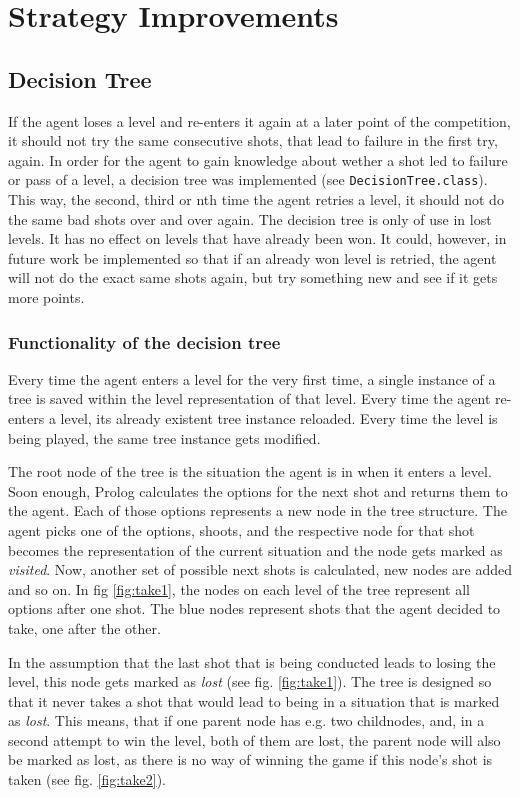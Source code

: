 \section{Strategy Improvements}\label{ch:strategy}

\subsection{Decision Tree}\label{subsec:decisionTree}
If the agent loses a level and re-enters it again at a later point of the competition, it should not try the same consecutive shots, that lead to failure in the first try, again. In order for the agent to gain knowledge about wether a shot led to failure or pass of a level, a decision tree was implemented (see \texttt{DecisionTree.class}). This way, the second, third or nth time the agent retries a level, it should not do the same bad shots over and over again. The decision tree is only of use in lost levels. It has no effect on levels that have already been won. It could, however, in future work be implemented so that if an already won level is retried, the agent will not do the exact same shots again, but try something new and see if it gets more points.

\subsubsection{Functionality of the decision tree}
Every time the agent enters a level for the very first time, a single instance of a tree is saved within the level representation of that level. Every time the agent re-enters a level, its already existent tree instance reloaded. Every time the level is being played, the same tree instance gets modified.

The root node of the tree is the situation the agent is in when it enters a level. Soon enough, Prolog calculates the options for the next shot and returns them to the agent. Each of those options represents a new node in the tree structure. The agent picks one of the options, shoots, and the respective node for that shot becomes the representation of the current situation and the node gets marked as \textit{visited}. Now, another set of possible next shots is calculated, new nodes are added and so on. In fig \ref{fig:take1}, the nodes on each level of the tree represent all options after one shot. The blue nodes represent shots that the agent decided to take, one after the other.

In the assumption that the last shot that is being conducted leads to losing the level, this node gets marked as \textit{lost} (see fig. \ref{fig:take1}). The tree is designed so that it never takes a shot that would lead to being in a situation that is marked as \textit{lost}. This means, that if one parent node has e.g. two childnodes, and, in a second attempt to win the level, both of them are lost, the parent node will also be marked as lost, as there is no way of winning the game if this node's shot is taken (see fig. \ref{fig:take2}).

